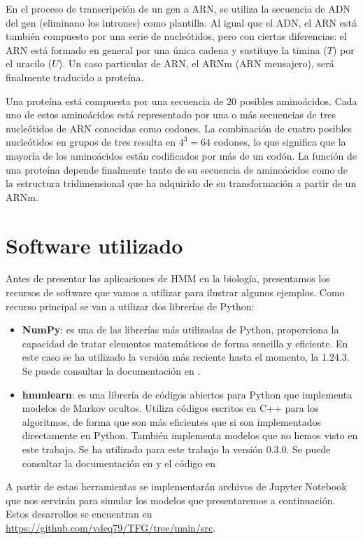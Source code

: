 En el proceso de transcripción de un gen a ARN, se utiliza la secuencia de ADN del gen (eliminano los intrones) como plantilla. Al igual que el ADN, el ARN está también compuesto por una serie de nucleótidos, pero con ciertas diferencias: el ARN está formado en general por una única cadena y sustituye la timina ($T$) por el uracilo ($U$). Un caso particular de ARN, el ARNm (ARN mensajero), será finalmente traducido a proteína.

Una proteína está compuesta por una secuencia de $20$ posibles aminoácidos. Cada uno de estos aminoácidos está representado por una o más secuencias de tres nucleótidos de ARN conocidas como codones. La combinación de cuatro posibles nucleótidos en grupos de tres resulta en $4^3=64$ codones, lo que significa que la mayoría de los aminoácidos están codificados por más de un codón. La función de una proteína depende finalmente tanto de su secuencia de aminoácidos como de la estructura tridimensional que ha adquirido de su transformación a partir de un ARNm. 

\section{Software utilizado}
Antes de presentar las aplicaciones de HMM en la biología, presentamos los recursos de software que vamos a utilizar para ilustrar algunos ejemplos. Como recurso principal se van a utilizar dos librerías de Python:
\begin{itemize}
    \item \textbf{NumPy}: es una de las librerías más utilizadas de Python, proporciona la capacidad de tratar elementos matemáticos de forma sencilla y eficiente. En este caso se ha utilizado la versión más reciente hasta el momento, la 1.24.3. Se puede consultar la documentación en \cite{numpy}.
    \item \textbf{hmmlearn}: es una librería de códigos abiertos para Python que implementa modelos de Markov ocultos. Utiliza códigos escritos en C++ para los algoritmos, de forma que son más eficientes que si son implementados directamente en Python. También implementa modelos que no hemos visto en este trabajo. Se ha utilizado para este trabajo la versión 0.3.0. Se puede consultar la documentación en \cite{hmmlearn} y el código en \cite{hmmlearnGithub}
\end{itemize}
A partir de estas herramientas se implementarán archivos de Jupyter Notebook que nos servirán para simular los modelos que presentaremos a continuación. Estos desarrollos se encuentran en \url{https://github.com/vdeq79/TFG/tree/main/src}.

